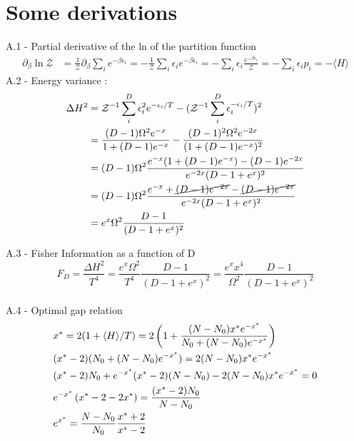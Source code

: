 \documentclass{article}
\begin{document}
\section{Some derivations}
A.1 - Partial derivative of the ln of the partition function 
\begin{align}
    \partial_\beta\ln\mathcal{Z}&=\frac{1}{\mathcal{Z}}\partial_\beta\sum_ie^{-\beta\epsilon_i}
    =-\frac{1}{\mathcal{Z}}\sum_i\epsilon_ie^{-\beta\epsilon_i}=-\sum_i\epsilon_i\frac{e^{-\beta\epsilon_i}}{\mathcal{Z}} =- \sum_i\epsilon_ip_i = -\langle H \rangle
\label{A1}
\end{align}
A.2 - Energy variance :
\begin{align}
\label{A2}
  \Delta H^2 &= \mathcal{Z}^{-1}\sum_i^D\epsilon_i^2e^{-\epsilon_i/T} - (\mathcal{Z}^{-1}\sum_i^D\epsilon_i^{-\epsilon_i/T})^2 \notag  \\
  &=\frac{(D-1)\Omega^2e^{-x}}{1+(D-1)e^{-x}} - \frac{(D-1)^2\Omega^2e^{-2x}}{(1+(D-1)e^{-x})^2} \notag \\
  &=(D-1)\Omega^2\frac{e^{-x}(1+(D-1)e^{-x})-(D-1)e^{-2x}}{e^{-2x}(D-1+e^x)^2}\notag \\
  &=(D-1)\Omega^2\frac{e^{-x}+\cancel{(D-1)e^{-2x}}-\cancel{(D-1)e^{-2x}}}{e^{-2x}(D-1+e^x)^2} \notag \\
  &=e^x\Omega^2\frac{D-1}{(D-1+e^x)^2}  
\end{align}

A.3 - Fisher Information as a function of D\\
\begin{equation}
    F_D = \frac{\Delta H^2}{T^4} = \frac{e^x\Omega^2}{T^4}\frac{D-1}{(D-1+e^x)^2}=\frac{e^x x^4}{\Omega^2}\frac{D-1}{(D-1+e^x)^2}
    \label{A3}
\end{equation}\\

A.4 - Optimal gap relation
\begin{align}
    &x^*=2(1+\langle H \rangle/T) = 2\left(1 + \frac{(N-N_0)x^* e^{-x^*}}{N_0+(N-N_0)e^{-x^*}}\right)\notag\\
    &(x^*-2)(N_0+(N-N_0)e^{-x^*})=2(N-N_0)x^* e^{-x^*}\notag\\
    &(x^*-2)N_0 + e^{-x^*} (x^*-2)(N-N_0) -2(N-N_0)x^* e^{-x^*} = 0 \notag\\
    &e^{-x^*}\left(x^*-2-2x^*\right)=\frac{(x^*-2)N_0}{N-N_0} \notag\\
    &e^{x^*} = \frac{N-N_0}{N_0}\frac{x^*+2}{x^*-2}
    \label{A4}
\end{align}
\end{document}
